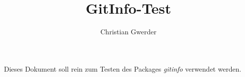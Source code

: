 \documentclass{scrartcl}
\title{GitInfo-Test}
\author{Christian Gwerder}
\begin{document}
Dieses Dokument soll rein zum Testen des Packages \textit{gitinfo} verwendet werden.
\end{document}
